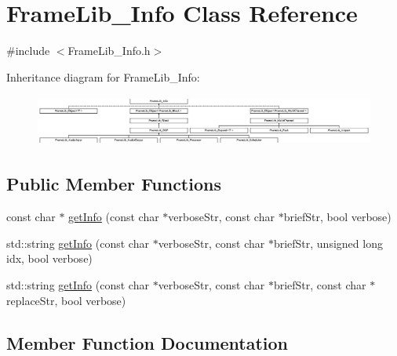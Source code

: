 \hypertarget{class_frame_lib___info}{}\section{Frame\+Lib\+\_\+\+Info Class Reference}
\label{class_frame_lib___info}


{\ttfamily \#include $<$Frame\+Lib\+\_\+\+Info.\+h$>$}

Inheritance diagram for Frame\+Lib\+\_\+\+Info\+:\begin{figure}[H]
\begin{center}
\leavevmode
\includegraphics[height=1.696970cm]{class_frame_lib___info}
\end{center}
\end{figure}
\subsection*{Public Member Functions}
\begin{DoxyCompactItemize}
\item 
const char $\ast$ \hyperlink{class_frame_lib___info_a22a5afed75b8f072b79278dd230c5952}{get\+Info} (const char $\ast$verbose\+Str, const char $\ast$brief\+Str, bool verbose)
\item 
std\+::string \hyperlink{class_frame_lib___info_a25dcefc87f96b26a1cd17592b9b09f6f}{get\+Info} (const char $\ast$verbose\+Str, const char $\ast$brief\+Str, unsigned long idx, bool verbose)
\item 
std\+::string \hyperlink{class_frame_lib___info_aac2ae7aa23772c4580d68ed6b4b493fb}{get\+Info} (const char $\ast$verbose\+Str, const char $\ast$brief\+Str, const char $\ast$replace\+Str, bool verbose)
\end{DoxyCompactItemize}


\subsection{Member Function Documentation}
\mbox{\label{class_frame_lib___info_a22a5afed75b8f072b79278dd230c5952}} 
